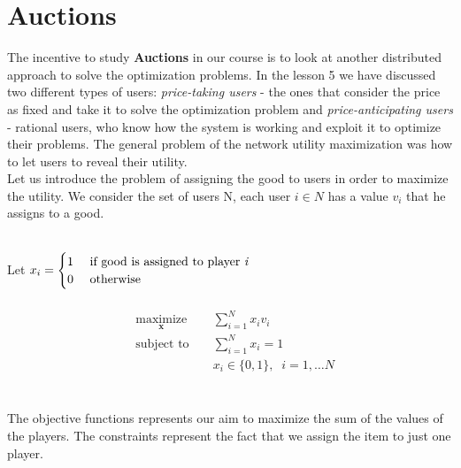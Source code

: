 \documentclass{article}
\begin{document}
\section{Auctions} The incentive to study \textbf{Auctions} in our course is to look at another distributed approach to solve the optimization problems. In the lesson 5 we have discussed two different types of users: \textit{price-taking users} - the ones that consider the price as fixed and take it to solve the optimization problem and \textit{price-anticipating users} - rational users, who know how the system is working and exploit it to optimize their problems. The general problem of the network utility maximization was how to let users to reveal their utility. \\
Let us introduce the problem of assigning the good to users in order to maximize the utility. We consider the set of users N, each user $i \in N$ has a value $v_i$ that he assigns to a good. 

\mbox{}\\

Let $x_{i}= 
\begin{cases}
	1 \hfill & \text{ if good is assigned to player \textit{i}} \\
	0 \hfill &\text{ otherwise}\\
\end{cases}
\\
$ \mbox{}\\

\mbox{}\\

\begin{equation*}
\begin{aligned}
& \underset{\mathbf{x}}{\textrm{maximize} }
& & \sum_{i=1}^{N} x_{i}v_{i}\\
& \textrm{subject to } 
	&& \sum_{i=1}^N x_i=1\\
	&&& x_i \in \{0,1\},  \;\; i=1, \dots N \\
\end{aligned}
	\label{e:value_ttil} 
\end{equation*}


\mbox{}\\

The objective functions represents our aim to maximize the sum of the values of the players. The constraints represent the fact that we assign the item to just one player.
\end{document}
